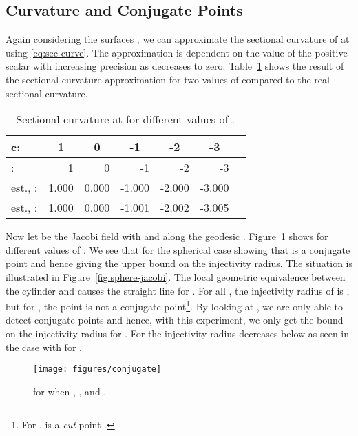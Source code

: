 \documentclass[final]{svjour3}
\begin{document}
\subsection{Curvature and Conjugate Points}
Again considering the surfaces ,
we can approximate the sectional curvature  of
 at  using \eqref{eq:sec-curve}.
The approximation is dependent on the value of the positive scalar  with 
increasing precision as  decreases to zero.
Table~\ref{table:Ks} shows the result of the sectional curvature approximation for 
two values of  compared to the real sectional curvature.
\begin{table}[ht]
    \scriptsize
    \setlength{\tabcolsep}{5pt}
\begin{center}
\begin{tabular}{lrrrrrr}
  \hline
  \bf{c}: & 
\multicolumn{1}{c}{\bf{1}} &
  \multicolumn{1}{c}{\bf{0}} &
  \multicolumn{1}{c}{\bf{-1}} & 
  \multicolumn{1}{c}{\bf{-2}} &
  \multicolumn{1}{c}{\bf{-3}}\\
  \hline
  :        
& 1   & 0  & -1  & -2  & -3  \\
   est., :  
& 1.000   & 0.000  & -1.000  & -2.000  & -3.000  \\
   est., :  
& 1.000   & 0.000  & -1.001  & -2.002  & -3.005  \\
   \hline
\end{tabular}
\caption{Sectional curvature at  for different values of .}
\label{table:Ks}
\end{center}
\end{table}

Now let  be the Jacobi field with  and  along the geodesic
. Figure~\ref{fig:conjugate} shows  for different values of .
We see that  for the spherical case  showing that  is a conjugate point and
hence giving the upper bound  on the injectivity radius.
The situation is illustrated in Figure~\ref{fig:sphere-jacobi}.
The local geometric equivalence between the cylinder  and  causes the
straight line for . 
For all , the injectivity radius of  is , but for , the point  
is not a conjugate point\footnote{
For ,  is a \emph{cut} point 
\cite[Chap.  13]{do_carmo_riemannian_1992}.
}. By looking at , we are only able to detect
conjugate points and hence, with this experiment, we only get the bound on the injectivity radius for
. For  the injectivity radius decreases below  as seen in the
case  with  for .
\begin{figure}[t]
    \begin{center}
      \texttt{[image: figures/conjugate]}
    \end{center}
    \caption{ for  when , , and .}
    \label{fig:conjugate}
\end{figure}
\end{document}
